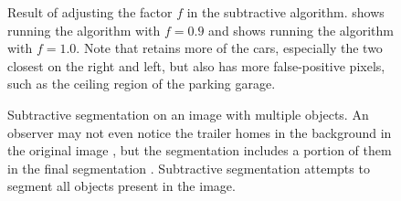 \documentclass[10pt,twocolumn,letterpaper]{article}
\begin{document}
\begin{figure}
\centering
{}
 \caption{Result of adjusting the factor $f$ in the subtractive
algorithm.  shows running the algorithm with $f=0.9$
and  shows running the algorithm with $f=1.0$.  Note
that  retains more of the cars, especially the two
closest on the right and left, but also has more false-positive
pixels, such as the ceiling region of the parking garage.}
\label{fig:f}
\end{figure}

\begin{figure}
\centering
{}
 \caption{Subtractive segmentation on an image with multiple objects.
An observer may not even notice the trailer homes in the background in
the original image ,
but the segmentation includes a portion of them in the final segmentation .
Subtractive segmentation attempts to segment all objects present
in the image.}
\label{fig:sub1}
\end{figure}

\end{document}

